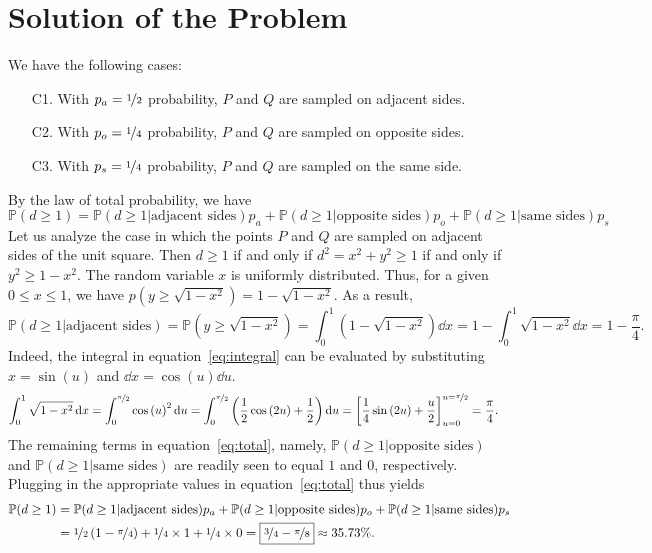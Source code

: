 \section{Solution of the Problem}
\label{sec:solution}

We have the following cases:
%
\begin{enumerate}
    \setlength\itemsep{0em}
    \item[C1.] With $p_a = \nicefrac{1}{2}$ probability, $P$ and $Q$ are sampled
        on adjacent sides.
    \item[C2.] With $p_o = \nicefrac{1}{4}$ probability, $P$ and $Q$ are sampled
        on opposite sides.
    \item[C3.] With $p_s = \nicefrac{1}{4}$ probability, $P$ and $Q$ are sampled
        on the same side.
\end{enumerate}
%
By the law of total probability, we have 
\begin{equation}
    \mathbb{P}(d \geq 1) = \mathbb{P}(d \geq 1 | \text{adjacent sides})p_a +
    \mathbb{P}(d \geq 1 | \text{opposite sides})p_o + \mathbb{P}(d \geq 1 |
    \text{same sides})p_s
    \label{eq:total}
\end{equation}
%
Let us analyze the case in which the points $P$ and $Q$ are sampled on adjacent
sides of the unit square. Then $d \geq 1$ if and only if $d^2 = x^2 + y^2 \geq
1$ if and only if $y^2 \geq 1 - x^2$. The random variable $x$ is uniformly
distributed. Thus, for a given $0 \leq x \leq 1$, we have $p(y \geq
\sqrt{1-x^2}) = 1- \sqrt{1 - x^2}$. As a result,
\begin{equation}
    \mathbb{P}(d \geq 1 | \text{adjacent sides}) = \mathbb{P}(y \geq
    \sqrt{1-x^2}) = \int_0^1 \left(1 - \sqrt{1-x^2} \right) \dd x = 1 - \int_0^1
    \sqrt{1 - x^2}\dd x = 1 - \frac{\pi}{4}.
    \label{eq:integral}
\end{equation}
%
Indeed, the integral in equation~\eqref{eq:integral} can be evaluated by
substituting $x = \sin{(u)}$ and $\dd x = \cos{(u)} \dd u$.
\begin{align*}
    \int_0^1 \sqrt{1-x^2} \operatorname{d}\! x &= \int_0^{\nicefrac{\pi}{2}} \cos{(u)}^2 \operatorname{d}\! u
    = \int_0^{\nicefrac{\pi}{2}} \left( \frac{1}{2}\cos{(2u)} + \frac{1}{2}
    \right) \operatorname{d}\! u = \left[\frac{1}{4}\sin{(2u)} +
    \frac{u}{2}\right]_{u=0}^{u=\nicefrac{\pi}{2}} = \frac{\pi}{4}.
\end{align*}
%
%
The remaining terms in equation~\eqref{eq:total}, namely, $\mathbb{P}(d \geq 1
|\text{opposite sides})$ and $\mathbb{P}(d \geq 1 | \text{same sides})$ are
readily seen to equal $1$ and $0$, respectively. Plugging in the appropriate
values in equation~\eqref{eq:total} thus yields
%
\begin{align*}
    \mathbb{P}(d \geq 1) &= \mathbb{P}(d \geq 1 | \text{adjacent sides})p_a +
    \mathbb{P}(d \geq 1 | \text{opposite sides})p_o + \mathbb{P}(d \geq 1 |
    \text{same sides})p_s \\ &= \nicefrac{1}{2}\left(1 -
    \nicefrac{\pi}{4}\right) + \nicefrac{1}{4} \times 1 + \nicefrac{1}{4} \times
    0 = \boxed{\nicefrac{3}{4} - \nicefrac{\pi}{8}}\approx 35.73\%.
\end{align*}
